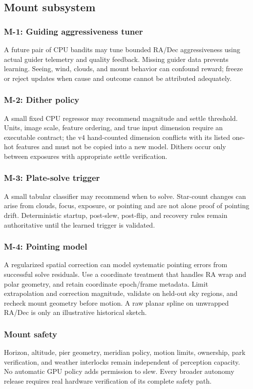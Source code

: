 \documentclass[11pt,a4paper]{article}
\begin{document}
\subsection{Mount subsystem}
\subsubsection{M-1: Guiding aggressiveness tuner}
A future pair of CPU bandits may tune bounded RA/Dec aggressiveness using
actual guider telemetry and quality feedback. Missing guider data prevents
learning. Seeing, wind, clouds, and mount behavior can confound reward; freeze
or reject updates when cause and outcome cannot be attributed adequately.

\subsubsection{M-2: Dither policy}
A small fixed CPU regressor may recommend magnitude and settle threshold.
Units, image scale, feature ordering, and true input dimension require an
executable contract; the v4 hand-counted dimension conflicts with its listed
one-hot features and must not be copied into a new model. Dithers occur only
between exposures with appropriate settle verification.

\subsubsection{M-3: Plate-solve trigger}
A small tabular classifier may recommend when to solve. Star-count changes
can arise from clouds, focus, exposure, or pointing and are not alone proof of
pointing drift. Deterministic startup, post-slew, post-flip, and recovery rules
remain authoritative until the learned trigger is validated.

\subsubsection{M-4: Pointing model}
A regularized spatial correction can model systematic pointing errors from
successful solve residuals. Use a coordinate treatment that handles RA wrap
and polar geometry, and retain coordinate epoch/frame metadata. Limit
extrapolation and correction magnitude, validate on held-out sky regions, and
recheck mount geometry before motion. A raw planar spline on unwrapped RA/Dec
is only an illustrative historical sketch.

\subsubsection{Mount safety}
Horizon, altitude, pier geometry, meridian policy, motion limits, ownership,
park verification, and weather interlocks remain independent of perception
capacity. No automatic GPU policy adds permission to slew. Every broader
autonomy release requires real hardware verification of its complete safety path.
\end{document}
